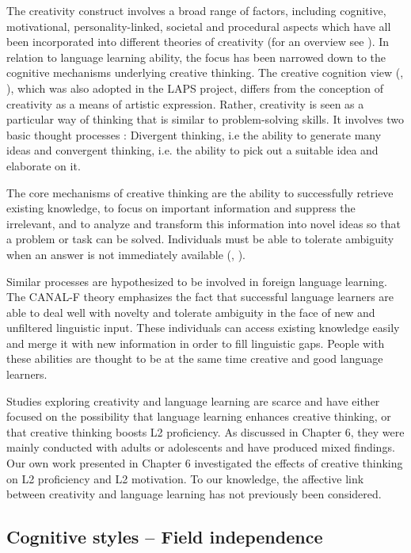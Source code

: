 \documentclass[output=paper]{langscibook}
\begin{document}
The creativity construct involves a broad range of factors, including cognitive, motivational, personality-linked, societal and procedural aspects which have all been incorporated into different theories of creativity (for an overview see \citealt{Lubart1994}). In relation to language learning ability, the focus has been narrowed down to the cognitive mechanisms underlying creative thinking. The creative cognition view (\citealt{FinkeEtAl1992}, \citealt{Cropley2006}), which was also adopted in the LAPS project, differs from the conception of creativity as a means of artistic expression. Rather, creativity is seen as a particular way of thinking that is similar to problem-solving skills. It involves two basic thought processes \citep{Guilford1950}: Divergent thinking, i.e the ability to generate many ideas and convergent thinking, i.e. the ability to pick out a suitable idea and elaborate on it.

The core mechanisms of creative thinking are the ability to successfully retrieve existing knowledge, to focus on important information and suppress the irrelevant, and to analyze and transform this information into novel ideas so that a problem or task can be solved. Individuals must be able to tolerate ambiguity when an answer is not immediately available (\citealt{Guilford1950}, \citealt{FinkeEtAl1992}). 

Similar processes are hypothesized to be involved in foreign language learning. The CANAL-F theory \citep{GrigorenkoEtAl2000} emphasizes the fact that successful language learners are able to deal well with novelty and tolerate ambiguity in the face of new and unfiltered linguistic input. These individuals can access existing knowledge easily and merge it with new information in order to fill linguistic gaps. People with these abilities are thought to be at the same time creative and good language learners. 

Studies exploring creativity and language learning are scarce and have either focused on the possibility that language learning enhances creative thinking, or that creative thinking boosts L2 proficiency. As discussed in Chapter 6, they were mainly conducted with adults or adolescents and have produced mixed findings. Our own work presented in Chapter 6 investigated the effects of creative thinking on L2 proficiency and L2 motivation. To our knowledge, the affective link between creativity and language learning has not previously been considered.

\subsection{Cognitive styles – Field independence} %
\end{document}
